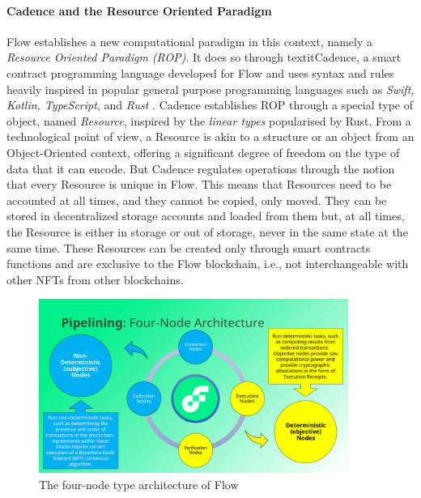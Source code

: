 \documentclass[../main.tex]{subfiles}
\begin{document}
\paragraph{Cadence and the Resource Oriented Paradigm}
Flow establishes a new computational paradigm in this context, namely a \textit{Resource Oriented Paradigm (ROP)}. It does so through textit{Cadence}, a smart contract programming language developed for Flow and uses syntax and rules heavily inspired in popular general purpose programming languages such as \textit{Swift, Kotlin, TypeScript}, and \textit{Rust} \cite{Cadence2023}. Cadence establishes ROP through a special type of object, named \textit{Resource}, inspired by the \textit{linear types} popularised by Rust. From a technological point of view, a Resource is akin to a structure or an object from an Object-Oriented context, offering a significant degree of freedom on the type of data that it can encode. But Cadence regulates operations through the notion that every Resource is unique in Flow. This means that Resources need to be accounted at all times, and they cannot be copied, only moved. They can be stored in decentralized storage accounts and loaded from them but, at all times, the Resource is either in storage or out of storage, never in the same state at the same time. These Resources can be created only through smart contracts functions and are exclusive to the Flow blockchain, i.e., not interchangeable with other NFTs from other blockchains.

\par

\begin{figure}[htp]
    \centering
    \includegraphics[width=0.9\textwidth]{../Images/03_Flow_architecture.png}
    \caption{The four-node type architecture of Flow \cite{Hentschel2019c}}
    \label{fig:flow_architecture}
\end{figure}
\end{document}
